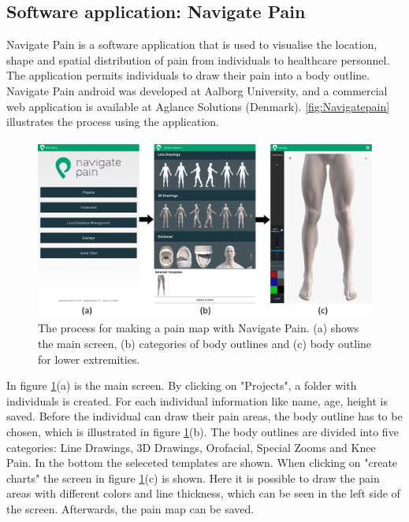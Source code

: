 \subsection{Software application: Navigate Pain} \label{sec:nav}
Navigate Pain is a software application that is used to visualise the location, shape and spatial distribution of pain from individuals to healthcare personnel. The application permits individuals to draw their pain into a body outline. Navigate Pain android was developed at Aalborg University, and a commercial web application is available at Aglance Solutions (Denmark).\citep{Solutions2015}
\autoref{fig:Navigatepain} illustrates the process using the application.

\begin{figure} [H]
\centering
\includegraphics[width=1\textwidth]{figures/Navigatepain}
\caption{The process for making a pain map with Navigate Pain. (a) shows the main screen, (b) categories of body outlines and (c) body outline for lower extremities.}
\label{fig:Navigatepain}
\end{figure}

\noindent
In figure \ref{fig:Navigatepain}(a) is the main screen. By clicking on "Projects", a folder with individuals is created. For each individual information like name, age, height is saved. Before the individual can draw their pain areas, the body outline has to be chosen, which is illustrated in figure \ref{fig:Navigatepain}(b). The body outlines are divided into five categories: Line Drawings, 3D Drawings, Orofacial, Special Zooms and Knee Pain. In the bottom the seleceted templates are shown. When clicking on "create charts" the screen in figure \ref{fig:Navigatepain}(c) is shown. Here it is possible to draw the pain areas with different colors and line thickness, which can be seen in the left side of the screen. Afterwards, the pain map can be saved.



